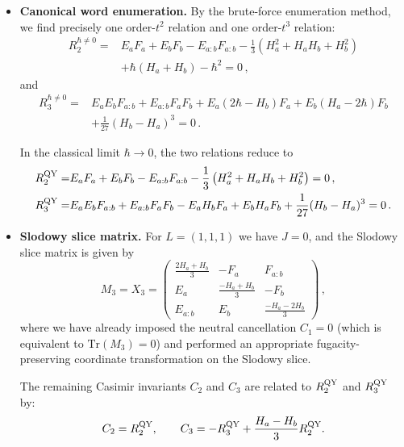 \documentclass[12pt,a4paper]{article}
\begin{document}
\begin{itemize}
    \item \textbf{Canonical word enumeration.} By the brute-force enumeration method, we find precisely one order-$t^2$ relation and one order-$t^3$ relation:
    \begin{align}
R_2^{\hbar\neq 0}=&E_aF_a+E_bF_b-E_{a:b}F_{a:b}
-\frac13\left(H_a^2+H_aH_b+H_b^2\right)
\nonumber\\
&+\hbar(H_a+H_b)-\hbar^2=0\,,
\label{eq:321-t2}
\end{align}
and 
\begin{align}
R_3^{\hbar\neq 0}=&E_aE_bF_{a:b}+E_{a:b}F_aF_b
+E_a(2\hbar-H_b)F_a+E_b(H_a-2\hbar)F_b
\nonumber\\
&+\frac1{27}(H_b-H_a)^3=0\,.
\label{eq:321-t3}
\end{align}

In the classical limit $\hbar\to 0$, the two relations reduce to
\begin{align}
    R^{\rm QY}_2=&E_aF_a+E_bF_b-E_{a:b}F_{a:b}
-\frac13\left(H_a^2+H_aH_b+H_b^2\right)=0\,,\\
R_3^{\rm QY}=&E_aE_bF_{a:b}+E_{a:b}F_aF_b
-E_aH_bF_a+E_bH_aF_b+\frac1{27}(H_b-H_a)^3=0\,.
\end{align}

\item \textbf{Slodowy slice matrix.} For $L=(1,1,1)$ we have $J=0$, and the Slodowy slice matrix is given by
\begin{equation}
 M_3=X_3=\begin{pmatrix}
 \frac{2H_a+H_b}{3}&-F_a&F_{a:b}\\
 E_a&\frac{-H_a+H_b}{3}&-F_b\\
 E_{a:b}&E_b&\frac{-H_a-2H_b}{3}
 \end{pmatrix}\,,
 \label{eq:321-slice}
\end{equation}
where we have already imposed the neutral cancellation $C_1=0$ (which is equivalent to $\text{Tr}(M_3)=0$) and performed an appropriate fugacity-preserving coordinate transformation on the Slodowy slice.

The remaining Casimir invariants $C_2$ and $C_3$ are related to $R_2^{\rm QY}$ and $R_3^{\rm QY}$ by:
\begin{equation}
 C_2=R_2^{\rm QY},\qquad
 C_3=-R_3^{\rm QY}+\frac{H_a-H_b}{3}R_2^{\rm QY}.
 \label{eq:321-comparison}
\end{equation}

\end{itemize}
\end{document}
